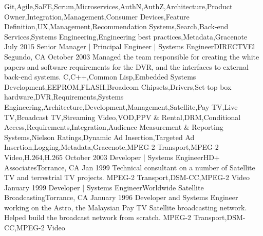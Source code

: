 \begin{experiences}
{                 }
                 {Git,Agile,SaFE,Scrum,Microservices,AuthN,AuthZ,Architecture,Product Owner,Integration,Management,Consumer Devices,Feature Definition,UX,Management,Recommendation Systems,Search,Back-end Services,Systems Engineering,Engineering best practices,Metadata,Gracenote}
  \emptySeparator
  \experience
    {July 2015}     {Senior Manager | Principal Engineer | Systems Engineer}{DIRECTV}{El Segundo, CA}
    {October 2003}    {
      Managed the team responsible for creating the white papers and software requirements for the DVR, and the interfaces to external back-end systems.
                    }
                    {C,C++,Common Lisp,Embedded Systems Development,EEPROM,FLASH,Broadcom Chipsets,Drivers,Set-top box hardware,DVR,Requirements,Systems Engineering,Architecture,Development,Management,Satellite,Pay TV,Live TV,Broadcast TV,Streaming Video,VOD,PPV \& Rental,DRM,Conditional Access,Requirements,Integration,Audience Measurement \& Reporting Systems,Nielson Ratings,Dynamic Ad Insertion,Targeted Ad Insertion,Logging,Metadata,Gracenote,MPEG-2 Transport,MPEG-2 Video,H.264,H.265}
  \emptySeparator
  \experience
  {October 2003}  {Developer | Systems Engineer}{HD+ Associates}{Torrance, CA}
  {Jan 1999}   {
    Technical consultant on a number of Satellite TV and terrestrial TV projects.
  }
                  {MPEG-2 Transport,DSM-CC,MPEG-2 Video}
  \emptySeparator
  \experience
  {January 1999}  {Developer | Systems Engineer}{Worldwide Satellite Broadcasting}{Torrance, CA}
  {January 1996}   {
    Developer and Systems Engineer working on the Astro, the Malaysian Pay TV Satellite broadcasting network. Helped build the broadcast network from scratch.
                  }
                  {MPEG-2 Transport,DSM-CC,MPEG-2 Video}
\end{experiences}
